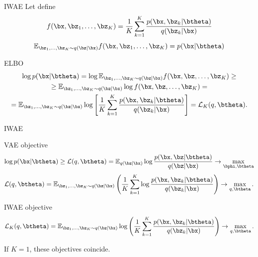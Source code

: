 \begin{frame}{IWAE}
	Let define
	\[
	f(\bx, \bz_1, \dots, \bz_K) = \frac{1}{K} \sum_{k=1}^K \frac{p(\bx, \bz_k | \btheta)}{q(\bz_k | \bx)}
	\]
	\[
		\mathbb{E}_{\bz_1, \dots, \bz_K \sim q(\bz | \bx)} f(\bx, \bz_1, \dots, \bz_K) = p(\bx | \btheta)
	\]
	\vspace{-0.3cm}
	\begin{block}{ELBO}
		\vspace{-0.5cm}
		\begin{multline*}
			\log p(\bx | \btheta) = \log \mathbb{E}_{\bz_1, \dots, \bz_K \sim q(\bz | \bx)} f(\bx, \bz, \dots, \bz_K) \geq \\
			\geq \mathbb{E}_{\bz_1, \dots, \bz_K \sim q(\bz | \bx)} \log f(\bx, \bz, \dots, \bz_K) = \\
			= \mathbb{E}_{\bz_1, \dots, \bz_K \sim q(\bz | \bx)} \log \left[\frac{1}{K} \sum_{k=1}^K\frac{p(\bx, \bz_k | \btheta)}{q(\bz_k | \bx)} \right] = \mathcal{L}_K(q, \btheta).
		\end{multline*}
	\end{block}
\end{frame}
\begin{frame}{IWAE}
	\begin{block}{VAE objective}
		\vspace{-0.2cm}
		\[
		\log p(\bx | \btheta) \geq \mathcal{L} (q, \btheta)  = \mathbb{E}_{q(\bz | \bx)} \log \frac{p(\bx, \bz | \btheta)}{q(\bz| \bx)} \rightarrow \max_{\bphi, \btheta}
		\]
		\[
		\mathcal{L} (q, \btheta)  = \mathbb{E}_{\bz_1, \dots, \bz_K \sim q(\bz | \bx)} \left( \frac{1}{K} \sum_{k=1}^K \log \frac{p(\bx, \bz_k | \btheta)}{q(\bz_k| \bx)} \right) \rightarrow \max_{q, \btheta}.
		\]
		\vspace{-0.2cm}
	\end{block}
	\begin{block}{IWAE objective}
		\vspace{-0.2cm}
		\[
		\mathcal{L}_K (q, \btheta)  = \mathbb{E}_{\bz_1, \dots, \bz_K \sim q(\bz | \bx)} \log \left( \frac{1}{K}\sum_{k=1}^K\frac{p(\bx, \bz_k | \btheta)}{q(\bz_k| \bx)} \right) \rightarrow \max_{q, \btheta}.
		\]
	\end{block}
	If $K=1$, these objectives coincide.

\end{frame}
